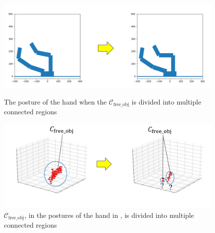 \documentclass[a4paper,twoside,12pt,papersize, dvipdfmx]{iirthesis}
\begin{document}
\begin{figure}[b]
    \centering        
    \includegraphics[width=0.8\hsize]{fig/2-sensorless-icm/cfree_obj_divided1.pdf}
    \caption{The posture of the hand when the $\mathcal{C}_{\mathrm{free\_obj}}$ is divided into multiple connected regions \cite{komiyama2021}}
    \label{fig::scim::divided1}

    \centering
    \includegraphics[width=0.85\hsize]{fig/2-sensorless-icm/cfree_obj_divided2.pdf}
    \caption{$\mathcal{C}_{\mathrm{free\_obj}}$, in the postures of the hand in , is divided into multiple connected regions \cite{komiyama2021}}
    \label{fig::sicm::divided2}
\end{figure}
\end{document}
